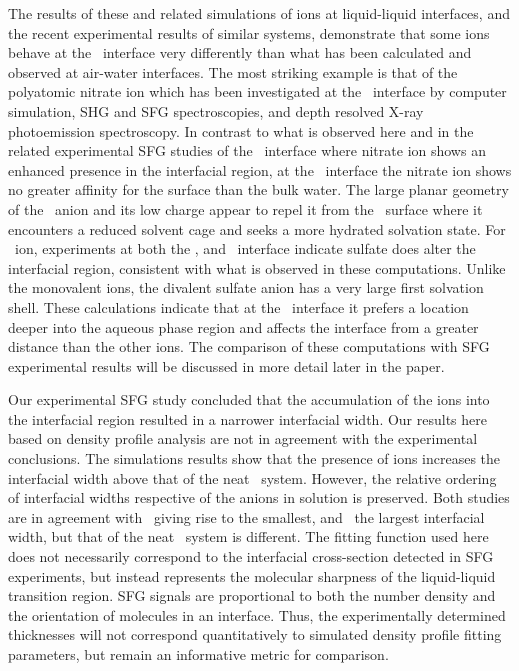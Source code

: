 The results of these and related simulations of ions at liquid-liquid interfaces, and the recent experimental results of similar systems, demonstrate that some ions behave at the \ctcwat~interface very differently than what has been calculated and observed at air-water interfaces.\cite{Wick2006,Wick2007a,Jungwirth2006a} The most striking example is that of the polyatomic nitrate ion which has been investigated at the \airwat~interface by computer simulation,\cite{Miller2009,Thomas2007} SHG and SFG spectroscopies,\cite{Otten2007,Schnitzer2000,Xu2009} and depth resolved X-ray photoemission spectroscopy.\cite{Brown2009} In contrast to what is observed here and in the related experimental SFG studies of the \ctcwat~interface where nitrate ion shows an enhanced presence in the interfacial region, at the \airwat~interface the nitrate ion shows no greater affinity for the surface than the bulk water. The large planar geometry of the \nit~anion and its low charge appear to repel it from the \airwat~surface where it encounters a reduced solvent cage and seeks a more hydrated solvation state. For \sul~ion, experiments at both the \airwat,\cite{Gopalakrishnan2005} and \ctcwat~interface indicate sulfate does alter the interfacial region, consistent with what is observed in these computations. Unlike the monovalent ions, the divalent sulfate anion has a very large first solvation shell. These calculations indicate that at the \ctcwat~interface it prefers a location deeper into the aqueous phase region and affects the interface from a greater distance than the other ions. The comparison of these computations with SFG experimental results will be discussed in more detail later in the paper.

Our experimental SFG study concluded that the accumulation of the ions into the interfacial region resulted in a narrower interfacial width.\cite{McFearin2009} Our results here based on density profile analysis are not in agreement with the experimental conclusions. The simulations results show that the presence of ions increases the interfacial width above that of the neat \ctcwat~system. However, the relative ordering of interfacial widths respective of the anions in solution is preserved. Both studies are in agreement with \nit~giving rise to the smallest, and \sul~the largest interfacial width, but that of the neat \ctcwat~system is different. The fitting function used here does not necessarily correspond to the interfacial cross-section detected in SFG experiments, but instead represents the molecular sharpness of the liquid-liquid transition region. SFG signals are proportional to both the number density and the orientation of molecules in an interface. Thus, the experimentally determined thicknesses will not correspond quantitatively to simulated density profile fitting parameters, but remain an informative metric for comparison.

